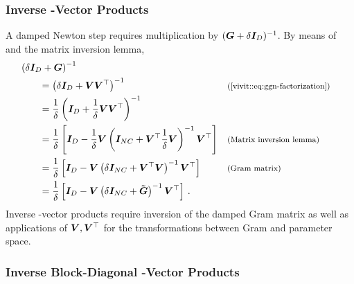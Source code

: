 \subsubsection{Inverse \ggn-Vector Products}

A damped Newton step requires multiplication by $({\bm{G}} + \delta
{\bm{I}}_D)^{-1}$. By means of  and the matrix
inversion lemma,
\begin{align}
  &\left(
  \delta \mI_D +  \mG
  \right)^{-1}
  \nonumber
    \\
  &\qquad =
    \left(
    \delta \mI_D + \mV \mV^\top
    \right)^{-1}
    \explainmath{(\Cref{vivit::eq:ggn-factorization})}
  \\
  \nonumber
  &\qquad =
    \frac{1}{\delta}
    \left(
    \mI_D + \frac{1}{\delta} \mV \mV^\top
    \right)^{-1}
  \\
  \nonumber
  &\qquad =
    \frac{1}{\delta}
    \left[
    \mI_D
    -
    \frac{1}{\delta} \mV
    \left(
    \mI_{NC}
    + \mV^\top \frac{1}{\delta} \mV
    \right)^{-1}
    \mV^\top
    \right]
    \explainmath{(Matrix inversion lemma)}
  \\
  \nonumber
  &\qquad =
    \frac{1}{\delta}
    \left[
    \mI_D
    -
    \mV
    \left(
    \delta \mI_{NC} + \mV^\top \mV
    \right)^{-1}
    \mV^\top
    \right]
    \explainmath{(Gram matrix)}
  \\
  &\qquad =
    \frac{1}{\delta}
    \left[
    \mI_D
    -
    \mV
    \left(
    \delta \mI_{NC} + \mGtilde
    \right)^{-1}
    \mV^\top
    \right]\,.
    \label{vivit::eq:inverse-ggn}
\end{align}
Inverse \ggn-vector products require inversion of the damped Gram matrix
as well as applications of ${\bm{V}}, {\bm{V}}^\top$ for the transformations between Gram
and parameter space.

\subsubsection{Inverse Block-Diagonal \ggn-Vector Products}

